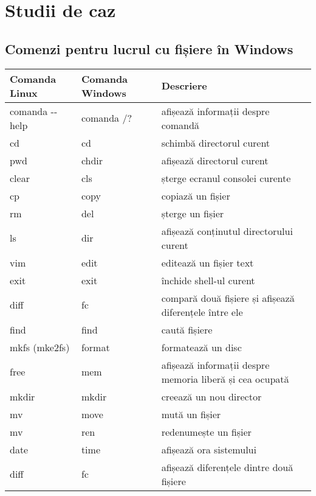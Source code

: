 
\section{Studii de caz}
\label{sec:file-system-case}

\subsection{Comenzi pentru lucrul cu fișiere în Windows}
\label{sec:file-system-case-windows}

\begin{table}[htb]
\begin{center}
	\begin{tabular}{ p{} p{}  p{} }
	\toprule
		\textbf{Comanda Linux} & \textbf{Comanda Windows} & \textbf{Descriere} \\
	\midrule
		comanda -{}-help & comanda /? & afișează informații despre comandă \\
	\midrule
		cd & cd & schimbă directorul curent \\
	\midrule
		pwd & chdir & afișează directorul curent \\
	\midrule
		clear & cls & șterge ecranul consolei curente \\
	\midrule
		cp & copy & copiază un fișier \\
	\midrule
		rm & del & șterge un fișier \\
	\midrule
		ls & dir & afișează conținutul directorului curent \\
	\midrule
		vim & edit & editează un fișier text \\
	\midrule
		exit & exit & închide shell-ul curent \\
	\midrule
		diff & fc & compară două fișiere și afișează diferențele între ele \\
	\midrule
		find & find & caută fișiere \\
	\midrule
		mkfs (mke2fs) & format & formatează un disc \\
	\midrule
		free & mem & afișează informații despre memoria liberă și cea ocupată \\
	\midrule
		mkdir & mkdir & creează un nou director \\
	\midrule
		mv & move & mută un fișier \\
	\midrule
		mv & ren & redenumește un fișier \\
	\midrule
		date & time & afișează ora sistemului \\
	\midrule
		diff & fc & afișează diferențele dintre două fișiere \\
	\bottomrule
	\end{tabular}
	\label{table:file-system-case-study}
\end{center}
\end{table}
